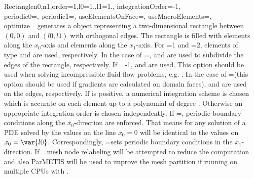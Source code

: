 \begin{funcdesc}{Rectangle}{n0,n1,order=1,l0=1.,l1=1., integrationOrder=-1, \\
  periodic0=\False, periodic1=\False, useElementsOnFace=\False, useMacroElements=\False,\\ optimize=\False}
generates a \Domain object representing a two-dimensional rectangle between
$(0,0)$ and $(l0,l1)$ with orthogonal edges.
The rectangle is filled with  elements along the $x_0$-axis and
 elements along the $x_1$-axis.
For =1 and =2, elements of type  and
 are used, respectively.
In the case of =\False,  and
 are used to subdivide the edges of the rectangle, respectively.
If =-1,  and 
are used. This option should be used when solving incompressible fluid flow
problems, e.g. .
In the case of =\True (this option should be used if
gradients are calculated on domain faces),  and
 are used on the edges, respectively.
If  is positive, a numerical integration scheme is chosen
which is accurate on each element up to a polynomial of degree
.
Otherwise an appropriate integration order is chosen independently.
If =\True, periodic boundary conditions
along the $x_0$-direction are enforced.
That means for any solution of a PDE solved by \finley the values on the line
$x_0=0$ will be identical to the values on $x_0=\var{l0}$.
Correspondingly, =\True sets periodic boundary conditions in the
$x_1$-direction.
If =\True mesh node relabeling will be attempted to reduce the
computation and also ParMETIS will be used to improve the mesh partition if
running on multiple CPUs with \MPI.
\end{funcdesc}

